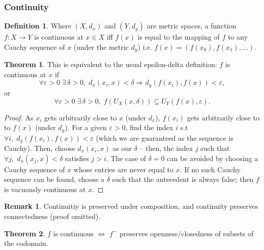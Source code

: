 \documentclass{article}
\theoremstyle{definition}
\newtheorem{thm}{Theorem}[subsubsection]
\newtheorem{defn}{Definition}[subsubsection]
\newtheorem{rmk}{Remark}[subsubsection]
\begin{document}
\subsubsection{Continuity}
\begin{defn}
	Where $(X,d_x)$ and $(Y,d_y)$ are metric spaces, a function $f:X\rightarrow Y$ is continuous at $x\in X$ iff $f(x)$ is equal to the mapping of $f$ to any Cauchy sequence of $x$ (under the metric $d_y$) i.e. $f(x)=(f(x_0),f(x_1),...)$.
\end{defn}
\begin{thm}
	This is equivalent to the usual epsilon-delta definition: $f$ is continuous at $x$ if \[\forall\varepsilon>0\;\exists\,\delta>0,\;d_x(x_i,x)<\delta\Rightarrow d_y(f(x_i),f(x))<\varepsilon,\]
	or
	\[\forall\varepsilon>0\;\exists\,\delta>0,\;f(U_X(x,\delta))\subseteq U_Y(f(x),\varepsilon).\]
\end{thm}
\begin{proof}
	As $x_i$ gets arbitrarily close to $x$ (under $d_x$), $f(x_i)$ gets arbitrarily close to to $f(x)$ (under $d_y$). For a given $\varepsilon>0$, find the index $i$ s.t $\forall i,\;d_y(f(x_i),f(x))<\varepsilon$ (which we are guaranteed as the sequence is Cauchy). Then, choose $d_x(x_i,x)$ as our $\delta$ -- then, the index $j$ such that $\forall j,\;d_x(x_j,x)<\delta$ satisfies $j>i$. The case of $\delta=0$ can be avoided by choosing a Cauchy sequence of $x$ whose entries are never equal to $x$. If no such Cauchy sequence can be found, choose a $\delta$ such that the antecedent is always false; then $f$ is vacuously continuous at $x$.
\end{proof}
\begin{rmk}
	Continuitiy is preserved under composition, and continuity preserves connectedness (proof omitted).
\end{rmk}
\begin{thm}
	$f$ is continuous $\iff$ $f^-$ preserves openness/closedness of subsets of the codomain.
\end{thm}
\end{document}
